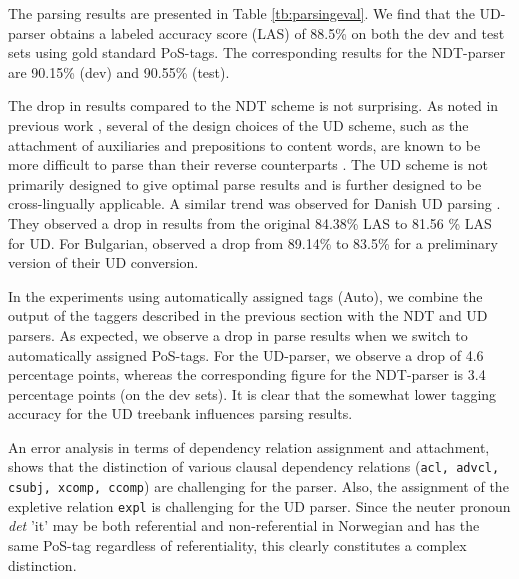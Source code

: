 \documentclass[10pt, a4paper]{article}
\begin{document}
The parsing results are presented in Table \ref{tb:parsingeval}. We
find that the UD-parser obtains a labeled accuracy score (LAS) of
88.5\% on both the dev and test sets using gold standard PoS-tags. The
corresponding results for the NDT-parser are 90.15\% (dev) and 90.55\%
(test).


The drop in results compared to the NDT scheme is not surprising. As
noted in previous work \cite{Mar:Doz:Sil:14}, several of the design
choices of the UD scheme, such as the attachment of auxiliaries and
prepositions to content words, are known to be more difficult to parse
than their reverse counterparts \cite{Sch:Abe:Rap:12}. The UD scheme
is not primarily designed to give optimal parse results and is further
designed to be cross-lingually applicable. A similar trend was
observed for Danish UD parsing \cite{Joh:Alo:Pla:15}. They observed a
drop in results from the original 84.38\% LAS to 81.56 \% LAS for UD.
For Bulgarian,  observed a drop from 89.14\% to
83.5\% for a preliminary version of their UD conversion.

In the experiments using automatically assigned tags (Auto), we
combine the output of the taggers described in the previous section
with the NDT and UD parsers. As expected, we observe a drop in parse
results when we switch to automatically assigned PoS-tags. For the
UD-parser, we observe a drop of 4.6 percentage points, whereas the
corresponding figure for the NDT-parser is 3.4 percentage points (on
the dev sets). It is clear that the somewhat lower tagging accuracy
for the UD treebank influences parsing results.

An error analysis in terms of dependency relation assignment and
attachment, shows that the distinction of various clausal dependency
relations ({\tt acl, advcl, csubj, xcomp, ccomp}) are challenging for
the parser. Also, the assignment of the expletive relation {\tt expl}
is challenging for the UD parser. Since the neuter pronoun {\it det}
'it' may be both referential and non-referential in Norwegian and has the same
PoS-tag regardless of referentiality, this clearly constitutes a
complex distinction.
\end{document}
